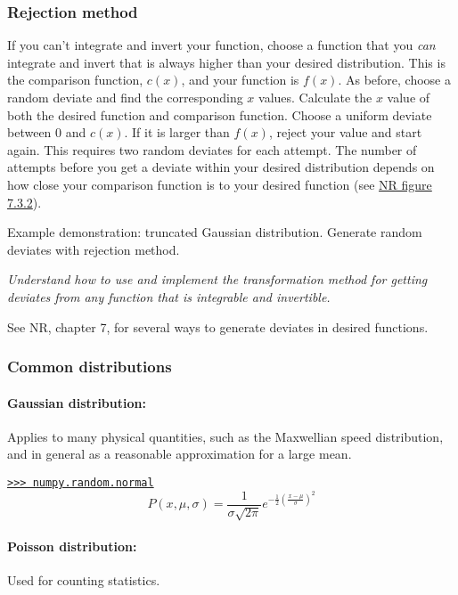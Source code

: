 \documentclass{article}
\newcommand{\test}[1]{%
    \begin{center}
        \colorbox{hl}{\parbox{0.9\textwidth}{\emph{\centering #1}}}
    \end{center}}
\begin{document}
\subsubsection{Rejection method}
If you can't integrate and invert your function, choose a function that you
\emph{can} integrate and invert that is always higher than your desired
distribution. This is the comparison function, $c(x)$, and your function is
$f(x)$. As before, choose a random deviate and find the corresponding $x$
values. Calculate the $x$ value of both the desired function and comparison
function. Choose a uniform deviate between 0 and $c(x)$. If it is larger
than $f(x)$, reject your value and start again. This requires two random
deviates for each attempt. The number of attempts before you get a deviate
within your desired distribution depends on how close your comparison
function is to your desired function (see
\href{http://astronomy.nmsu.edu/holtz/a575/images/NR.html}
{NR figure 7.3.2}).

\begin{framed}
    Example demonstration: truncated Gaussian distribution. Generate random
    deviates with rejection method.
\end{framed}

\test{Understand how to use and implement the transformation method for
getting deviates from any function that is integrable and invertible.}

See NR, chapter 7, for several ways to generate deviates in desired functions.

\subsubsection{Common distributions}

\paragraph{Gaussian distribution:}
Applies to many physical quantities, such as the Maxwellian speed distribution,
and in general as a reasonable approximation for a large mean.

\href{http://docs.scipy.org/doc/numpy/reference/generated/numpy.random.normal.html}
{\texttt{>>> numpy.random.normal}}
\begin{equation*}
    P(x,\mu,\sigma) = \frac{1}{\sigma\sqrt{2\pi}}
    e^{-\frac{1}{2}(\frac{x-\mu}{\sigma})^2   }
\end{equation*}

\paragraph{Poisson distribution:}
Used for counting statistics.
\end{document}

